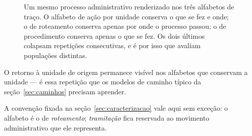 \begin{figure}[htbp]
\centering
{}
\caption{Um mesmo processo administrativo renderizado nos três alfabetos de traço. O alfabeto de
ação por unidade conserva o que se fez e onde; o de roteamento conserva apenas por onde o processo
passou; o de procedimento conserva apenas o que se fez. Os dois últimos colapsam repetições
consecutivas, e é por isso que avaliam populações distintas.}
\label{fig:alfabetos}
\end{figure}

\noindent O retorno à unidade de origem permanece visível nos alfabetos que conservam a unidade --- é essa repetição
que os modelos de caminho típico da seção~\ref{sec:caminhos} precisam aprender.

A convenção fixada na seção~\ref{sec:caracterizacao} vale aqui sem exceção: o alfabeto é o de
\emph{roteamento}; \emph{tramitação} fica reservada ao movimento administrativo que ele representa.

